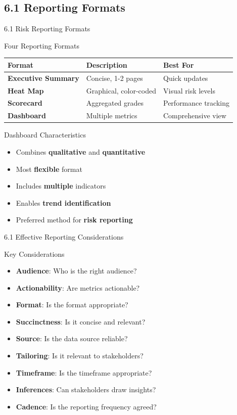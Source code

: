 \documentclass{beamer}
\begin{document}
	\subsection{6.1 Reporting Formats}
	\begin{frame}{6.1 Risk Reporting Formats}
		\begin{block}{Four Reporting Formats}
			\begin{tabular}{|p{2.5cm}|p{4cm}|p{4.5cm}|}
				\hline
				\textbf{Format} & \textbf{Description} & \textbf{Best For} \\
				\hline
				\textbf{Executive Summary} & Concise, 1-2 pages & Quick updates \\
				\hline
				\textbf{Heat Map} & Graphical, color-coded & Visual risk levels \\
				\hline
				\textbf{Scorecard} & Aggregated grades & Performance tracking \\
				\hline
				\textbf{Dashboard} & Multiple metrics & Comprehensive view \\
				\hline
			\end{tabular}
		\end{block}
		
		\begin{block}{Dashboard Characteristics}
			\begin{itemize}
				\item Combines \textbf{qualitative} and \textbf{quantitative}
				\item Most \textbf{flexible} format
				\item Includes \textbf{multiple} indicators
				\item Enables \textbf{trend identification}
				\item Preferred method for \textbf{risk reporting}
			\end{itemize}
		\end{block}
	\end{frame}
	
	\begin{frame}{6.1 Effective Reporting Considerations}
		\begin{block}{Key Considerations}
			\begin{itemize}
				\item \textbf{Audience}: Who is the right audience?
				\item \textbf{Actionability}: Are metrics actionable?
				\item \textbf{Format}: Is the format appropriate?
				\item \textbf{Succinctness}: Is it concise and relevant?
				\item \textbf{Source}: Is the data source reliable?
				\item \textbf{Tailoring}: Is it relevant to stakeholders?
				\item \textbf{Timeframe}: Is the timeframe appropriate?
				\item \textbf{Inferences}: Can stakeholders draw insights?
				\item \textbf{Cadence}: Is the reporting frequency agreed?
			\end{itemize}
		\end{block}
	\end{frame}
	
\end{document}
